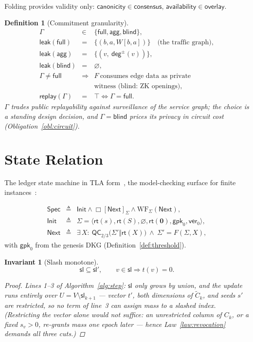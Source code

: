 \documentclass[11pt,letterpaper]{article}
\newtheorem{definition}{Definition}
\newtheorem{invariant}{Invariant}
\begin{document}
Folding provides validity only:
$\mathsf{canonicity}\in\mathsf{consensus}$,
$\mathsf{availability}\in\mathsf{overlay}$.

\begin{definition}[Commitment granularity]\label{def:granularity}
\[
\begin{array}{rcl}
\Gamma&\in&\{\mathsf{full},\mathsf{agg},\mathsf{blind}\},\\
\mathsf{leak}(\mathsf{full})&=&\{(b,a,W[b,a])\}
  \quad\text{(the traffic graph)},\\
\mathsf{leak}(\mathsf{agg})&=&\{(v,\ \mathsf{deg}^{\pm}(v))\},\\
\mathsf{leak}(\mathsf{blind})&=&\varnothing,\\
\Gamma\neq\mathsf{full}&\Rightarrow&
  F\ \text{consumes edge data as private}\\
&&\text{witness (blind: ZK openings)},\\
\mathsf{replay}(\Gamma)&=&\top\iff\Gamma=\mathsf{full}.
\end{array}
\]
$\Gamma$ trades public replayability against surveillance of the service
graph; the choice is a standing design decision, and
$\Gamma=\mathsf{blind}$ prices its privacy in circuit cost
(Obligation~\ref{obl:circuit}).
\end{definition}

\section{State Relation}\label{sec:spec}

The ledger state machine in TLA
form~\cite{LamportSpecifyingSystems}, the model-checking surface for
finite instances~\cite{Stateright}:

\[
\begin{array}{rcl}
\mathsf{Spec}&\triangleq&
  \mathsf{Init}\land\Box[\mathsf{Next}]_{\Sigma}
  \land\mathrm{WF}_{\Sigma}(\mathsf{Next}),\\[2pt]
\mathsf{Init}&\triangleq&
  \Sigma=\langle\mathsf{rt}(s),\mathsf{rt}(S),\varnothing,
  \mathsf{rt}(\mathbf{0}),\mathsf{gpk}_0,\mathsf{ver}_0\rangle,\\[2pt]
\mathsf{Next}&\triangleq&
  \exists\,X:\ \mathsf{QC}_{2/3}\bigl(\Sigma'\Vert\mathsf{rt}(X)\bigr)
  \ \land\ \Sigma'=F(\Sigma,X),
\end{array}
\]
with $\mathsf{gpk}_0$ from the genesis DKG
(Definition~\ref{def:threshold}).

\begin{invariant}[Slash monotone]\label{inv:slash}
\[
\mathsf{sl}\subseteq\mathsf{sl}',\qquad
v\in\mathsf{sl}\Rightarrow t(v)=0 .
\]
\begin{proof}
Lines 1--3 of Algorithm~\ref{alg:step}: $\mathsf{sl}$ only grows by
union, and the update runs entirely over
$U=V\setminus\mathsf{sl}_{k+1}$ --- vector $t'$, both dimensions of
$\tilde C_k$, and seeds $s'$ are restricted, so no term of line~3 can
assign mass to a slashed index.  (Restricting the vector alone would
not suffice: an unrestricted column of $C_k$, or a fixed $s_v>0$,
re-grants mass one epoch later --- hence
Law~\ref{law:revocation} demands all three cuts.)
\end{proof}
\end{invariant}
\end{document}
